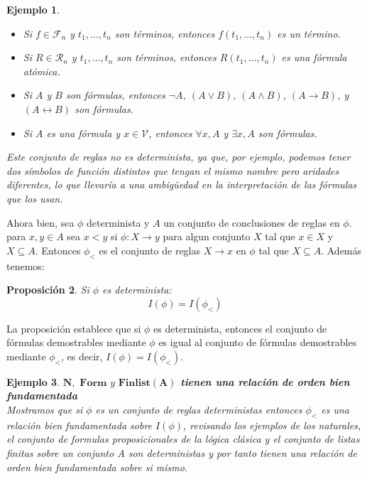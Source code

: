 \documentclass[executivepaper]{article}
\newtheorem{propo}{Proposición}[section]
\newtheorem{ejemplo}[propo]{Ejemplo}
\begin{document}
\begin{ejemplo}
\begin{itemize}
\begin{itemize}
            \item Si $f \in \mathcal{F}_n$ y $t_1,\ldots,t_n$ son términos, entonces $f(t_1,\ldots,t_n)$ es un término.
            \item Si $R \in \mathcal{R}_n$ y $t_1,\ldots,t_n$ son términos, entonces $R(t_1,\ldots,t_n)$ es una fórmula atómica.
            \item Si $A$ y $B$ son fórmulas, entonces $\neg A$, $(A \vee B)$, $(A \wedge B)$, $(A \rightarrow B)$, y $(A \leftrightarrow B)$ son fórmulas.
            \item Si $A$ es una fórmula y $x \in \mathcal{V}$, entonces $\forall x,A$ y $\exists x,A$ son fórmulas.
        \end{itemize}
        Este conjunto de reglas no es determinista, ya que, por ejemplo, podemos tener dos símbolos de función distintos que tengan el mismo nombre pero aridades diferentes, lo que llevaría a una ambigüedad en la interpretación de las fórmulas que los usan.
    \end{itemize}
\end{ejemplo}

Ahora bien, sea $\phi$ determinista y $A$ un conjunto de conclusiones de reglas en $\phi$. para $x,y\in A$ sea $x<y$ si $\phi: X\rightarrow y$ para algun conjunto $X$ tal que $x\in X$ y $X\subseteq A$. Entonces $\phi_<$ es el conjunto de reglas $X\rightarrow x$ en $\phi$ tal que $X\subseteq A$. Además tenemos:
\begin{propo}
    Si $\phi$ es determinista:
    $$I(\phi)=I(\phi_<)$$
\end{propo}
La proposición establece que si $\phi$ es determinista, entonces el conjunto de fórmulas demostrables mediante $\phi$ es igual al conjunto de fórmulas demostrables mediante $\phi_<$, es decir, $I(\phi) = I(\phi_<)$.
\begin{ejemplo}\textbf{$\mathbf{N},\,\, \mathbf{Form}\,\, { y } \,\, \mathbf{Finlist(A)}$ tienen una relación de orden bien fundamentada }\\
    Mostramos que si $\phi$ es un conjunto de reglas deterministas entonces $\phi_<$ es una relación bien fundamentada sobre $I(\phi)$, revisando los ejemplos de los naturales, el conjunto de formulas proposicionales de la lógica clásica y el conjunto de listas finitas sobre un conjunto $A$ son deterministas y por tanto tienen una relación de orden bien fundamentada sobre si mismo.
\end{ejemplo}
\end{document}
